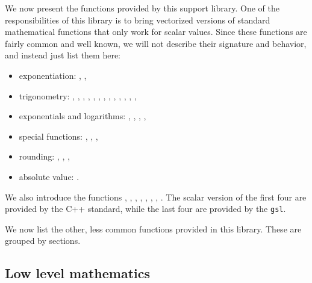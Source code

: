 We now present the functions provided by this support library. One of the responsibilities of this library is to bring vectorized versions of standard mathematical functions that only work for scalar values. Since these functions are fairly common and well known, we will not describe their signature and behavior, and instead just list them here:
\begin{itemize}
\item exponentiation: , ,
\item trigonometry: , , , , , , , , , , , , ,
\item exponentials and logarithms: , , , ,
\item special functions: , , ,
\item rounding: , , ,
\item absolute value: .
\end{itemize}

We also introduce the functions , , , , , , , . The scalar version of the first four are provided by the C++ standard, while the last four are provided by the \texttt{gsl}.

We now list the other, less common functions provided in this library. These are grouped by sections.

\subsection{Low level mathematics \label{SEC:support:math:lowlevel}}


